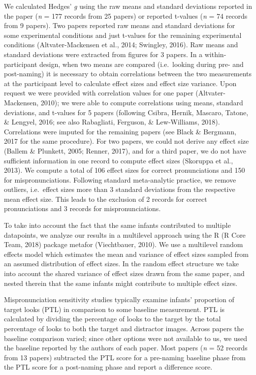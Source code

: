 \documentclass[man]{apa6}
\begin{document}
We calculated Hedges' \emph{g} using the raw means and standard deviations reported in the paper (\emph{n} = 177 records from 25 papers) or reported t-values (\emph{n} = 74 records from 9 papers). Two papers reported raw means and standard deviations for some experimental conditions and just t-values for the remaining experimental conditions (Altvater-Mackensen et al., 2014; Swingley, 2016). Raw means and standard deviations were extracted from figures for 3 papers. In a within-participant design, when two means are compared (i.e.~looking during pre- and post-naming) it is necessary to obtain correlations between the two measurements at the participant level to calculate effect sizes and effect size variance. Upon request we were provided with correlation values for one paper (Altvater-Mackensen, 2010); we were able to compute correlations using means, standard deviations, and t-values for 5 papers (following Csibra, Hernik, Mascaro, Tatone, \& Lengyel, 2016; see also Rabagliati, Ferguson, \& Lew-Williams, 2018). Correlations were imputed for the remaining papers (see Black \& Bergmann, 2017 for the same procedure). For two papers, we could not derive any effect size (Ballem \& Plunkett, 2005; Renner, 2017), and for a third paper, we do not have sufficient information in one record to compute effect sizes (Skoruppa et al., 2013). We compute a total of 106 effect sizes for correct pronunciations and 150 for mispronunciations. Following standard meta-analytic practice, we remove outliers, i.e.~effect sizes more than 3 standard deviations from the respective mean effect size. This leads to the exclusion of 2 records for correct pronunciations and 3 records for mispronunciations.

To take into account the fact that the same infants contributed to multiple datapoints, we analyze our results in a multilevel approach using the R (R Core Team, 2018) package metafor (Viechtbauer, 2010). We use a multilevel random effects model which estimates the mean and variance of effect sizes sampled from an assumed distribution of effect sizes. In the random effect structure we take into account the shared variance of effect sizes drawn from the same paper, and nested therein that the same infants might contribute to multiple effect sizes.

Mispronunciation sensitivity studies typically examine infants' proportion of target looks (PTL) in comparison to some baseline measurement. PTL is calculated by dividing the percentage of looks to the target by the total percentage of looks to both the target and distractor images. Across papers the baseline comparison varied; since other options were not available to us, we used the baseline reported by the authors of each paper. Most papers (\emph{n} = 52 records from 13 papers) subtracted the PTL score for a pre-naming baseline phase from the PTL score for a post-naming phase and report a difference score.
\end{document}
